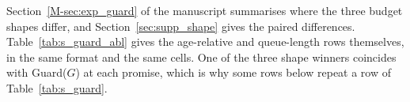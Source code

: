 \documentclass[mathematics,supfile,submit,moreauthors]{Definitions/mdpi}
\begin{document}

Section~\ref*{M-sec:exp_guard} of the manuscript summarises where the three budget shapes
differ, and Section~\ref{sec:supp_shape} gives the paired differences. Table~\ref{tab:s_guard_abl}
gives the age-relative and queue-length rows themselves, in the same format and the same
cells. One of the three shape winners coincides with Guard($G$) at each promise, which is
why some rows below repeat a row of Table~\ref{tab:s_guard}.
\end{document}
